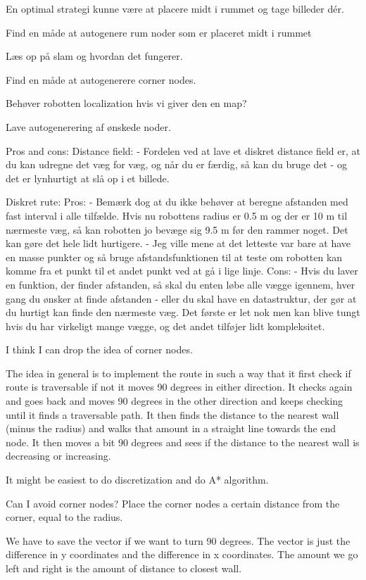 En optimal strategi kunne være at placere midt i rummet og tage billeder dér.

Find en måde at autogenere rum noder som er placeret midt i rummet

Læs op på slam og hvordan det fungerer.

Find en måde at autogenerere corner nodes.

Behøver robotten localization hvis vi giver den en map?

Lave autogenerering af ønskede noder.

Pros and cons: 
Distance field:
- Fordelen ved at lave et diskret distance field er, at du kan udregne det væg for væg, og når du er færdig, så kan du bruge det - og det er lynhurtigt at slå op i et billede. 

Diskret rute:
Pros:
- Bemærk dog at du ikke behøver at beregne afstanden med fast interval i alle tilfælde. Hvis nu robottens radius er 0.5 m og der er 10 m til nærmeste væg, så kan robotten jo bevæge sig 9.5 m før den rammer noget. Det kan gøre det hele lidt hurtigere.
- Jeg ville mene at det letteste var bare at have en masse punkter og så bruge afstandsfunktionen til at teste om robotten kan komme fra et punkt til et andet punkt ved at gå i lige linje.
Cons:
- Hvis du laver en funktion, der finder afstanden, så skal du enten løbe alle vægge igennem, hver gang du ønsker at finde afstanden - eller du skal have en datastruktur, der gør at du hurtigt kan finde den nærmeste væg. Det første er let nok men kan blive tungt hvis du har virkeligt mange vægge, og det andet tilføjer lidt kompleksitet.


I think I can drop the idea of corner nodes.

The idea in general is to implement the route in such a way that it first check if route is traversable if not it moves 90 degrees in either direction. It checks again and goes back and moves 90 degrees in the other direction and keeps checking until it finds a traversable path. It then finds the distance to the nearest wall (minus the radius) and walks that amount in a straight line towards the end node. It then moves a bit 90 degrees and sees if the distance to the nearest wall is decreasing or increasing.

It might be easiest to do discretization and do A* algorithm.


Can I avoid corner nodes?
Place the corner nodes a certain distance from the corner, equal to the radius.

We have to save the vector if we want to turn 90 degrees.
The vector is just the difference in y coordinates and the difference in x coordinates.
The amount we go left and right is the amount of distance to closest wall.

